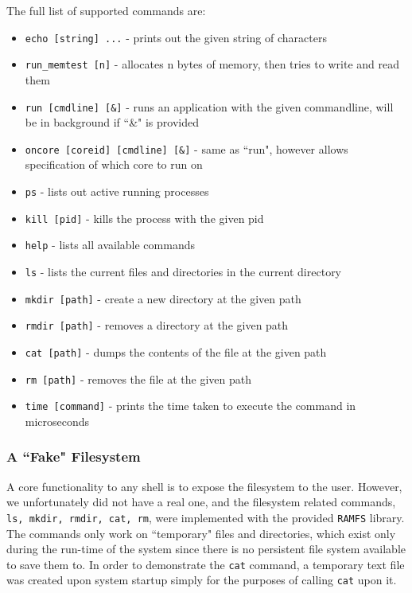 The full list of supported commands are:

\begin{itemize}
    \item \texttt{echo [string] ...} - prints out the given string of characters 
    \item \texttt{run\_memtest [n]} - allocates n bytes of memory, then tries to write and read them
    \item \texttt{run [cmdline] [\&]} - runs an application with the given commandline, will be in background if ``\&" is provided
    \item \texttt{oncore [coreid] [cmdline] [\&]} - same as ``run", however allows specification of which core to run on
    \item \texttt{ps} - lists out active running processes
    \item \texttt{kill [pid]} - kills the process with the given pid
    \item \texttt{help} - lists all available commands
    \item \texttt{ls} - lists the current files and directories in the current directory
    \item \texttt{mkdir [path]} - create a new directory at the given path
    \item \texttt{rmdir [path]} - removes a directory at the given path
    \item \texttt{cat [path]} - dumps the contents of the file at the given path
    \item \texttt{rm [path]} - removes the file at the given path
    \item \texttt{time [command]} - prints the time taken to execute the command in microseconds
\end{itemize}

\subsubsection{A ``Fake" Filesystem}
A core functionality to any shell is to expose the filesystem to the user. However, we unfortunately did not have a real one, and the filesystem related commands, \texttt{ls, mkdir, rmdir, cat, rm}, were implemented with the provided \texttt{RAMFS} library. The commands only work on ``temporary" files and directories, which exist only during the run-time of the system since there is no persistent file system available to save them to. In order to demonstrate the \texttt{cat} command, a temporary text file was created upon system startup simply for the purposes of calling \texttt{cat} upon it.

